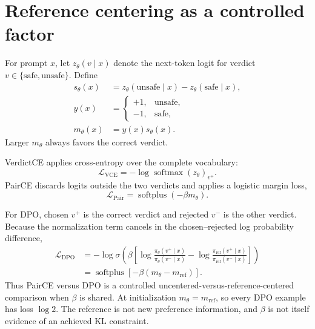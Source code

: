 \section{Reference centering as a controlled factor}
\label{sec:factorization}

For prompt $x$, let $z_\theta(v\mid x)$ denote the next-token logit for verdict
$v\in\{\mathrm{safe},\mathrm{unsafe}\}$. Define
\begin{align}
  s_\theta(x) &= z_\theta(\mathrm{unsafe}\mid x)
                -z_\theta(\mathrm{safe}\mid x),\\
  y(x) &= \begin{cases}+1,&\text{unsafe},\\-1,&\text{safe},\end{cases}\\
  m_\theta(x) &= y(x)s_\theta(x).
\end{align}
Larger $m_\theta$ always favors the correct verdict.

VerdictCE applies cross-entropy over the complete vocabulary:
\begin{equation}
  \mathcal{L}_{\mathrm{VCE}}
  =-\log\operatorname{softmax}(z_\theta)_{v^+}.
\end{equation}
PairCE discards logits outside the two verdicts and applies a logistic margin
loss,
\begin{equation}
  \mathcal{L}_{\mathrm{Pair}}
  =\operatorname{softplus}(-\beta m_\theta).
\end{equation}

For DPO, chosen $v^+$ is the correct verdict and rejected $v^-$ is the other
verdict. Because the normalization term cancels in the chosen--rejected log
probability difference,
\begin{equation}
\begin{split}
  \mathcal{L}_{\mathrm{DPO}}
  &= -\log\sigma\left(\beta\left[
    \log\frac{\pi_\theta(v^+\mid x)}{\pi_\theta(v^-\mid x)}
   -\log\frac{\pi_{\mathrm{ref}}(v^+\mid x)}{\pi_{\mathrm{ref}}(v^-\mid x)}
  \right]\right)\\
  &=\operatorname{softplus}\left[-\beta
    (m_\theta-m_{\mathrm{ref}})\right].
\end{split}
\end{equation}
Thus PairCE versus DPO is a controlled uncentered-versus-reference-centered
comparison when $\beta$ is shared. At initialization
$m_\theta=m_{\mathrm{ref}}$, so every DPO example has loss $\log 2$. The
reference is not new preference information, and $\beta$ is not itself evidence
of an achieved KL constraint.

